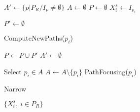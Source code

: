 \STATE $A' \gets \{p | P_R / I_p \neq \emptyset\}$
\STATE $A \gets \emptyset$
\STATE $P \gets \emptyset$ 
	\STATE $X_i^s \gets I_{p_i}$ \label{alg=X-init}
\ENDFOR 
{}

\STATE $P' \gets \emptyset$ 
	
\label{alg=start-add-paths}
\STATE ComputeNewPaths($p_i$) \label{alg=computeNewPaths}
\ENDFOR \label{alg=end-add-paths}

\STATE $P \gets P \cup P'$
\STATE $A' \gets \emptyset$

\STATE {}
 \label{alg=start-ascending} 
	\STATE Select $p_i \in A$
	\STATE $A \gets A \setminus \{p_i\}$
	\STATE PathFocusing($p_i$) 
	
\ENDWHILE \label{alg=end-ascending}
\STATE Narrow \label{alg=narrowing}
\ENDWHILE

\RETURN $\{X_i^s,\ i \in P_R\}$

